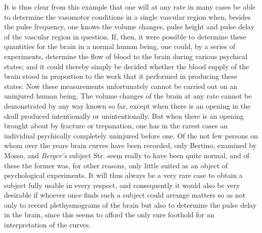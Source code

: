 \documentclass[12pt,a4paper,openany]{book}
\begin{document}
It is thus clear from this example that one will at any
rate in many cases be able to determine the vasomotor
conditions in a single vascular region when, besides
the pulse frequency, one knows the volume changes, pulse height and pulse delay
of the vascular region in question. If, then,
it were possible to determine these quantities for the brain
in a normal human being, one could, by
a series of experiments, determine the flow of blood to
the brain during various psychical states; and it could
thereby simply be decided whether the blood supply of the brain
stood in proportion to the work that it performed in producing
these states. Now these measurements unfortunately
cannot be carried out on an uninjured human being.
The volume changes of the brain at any rate cannot
be demonstrated by any way known so far, except when there
is an opening in the skull produced intentionally or unintentionally.
But when there is an opening brought about by fracture or trepanation,
one has in the rarest cases
an individual psychically completely uninjured
before one. Of the not few persons on whom over the years
brain curves have been recorded, only Bertino, examined by
Mosso, and \textit{Berger's} subject Str. seem really to
have been quite normal, and of these the former was, for other reasons,
only little suited as an object of psychological
experiments. It will thus always be a very rare
case to obtain a subject fully usable in every respect,
and consequently it would also be very desirable if
whoever once finds such a subject could arrange matters so as
not only to record plethysmograms of the brain but also to determine
the pulse delay in the brain, since this seems to afford
the only sure foothold for an interpretation of the curves.
\end{document}
